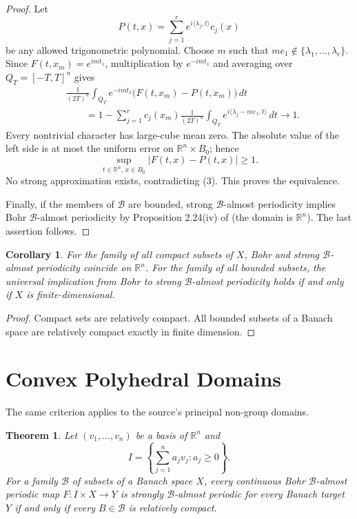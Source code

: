 \documentclass[11pt]{article}
\newtheorem{theorem}{Theorem}
\newtheorem{corollary}{Corollary}
\newcommand{\R}{\mathbb R}
\newcommand{\B}{\mathcal B}
\newcommand{\ip}[2]{\langle #1,#2\rangle}
\begin{document}
\begin{proof}
Let
\[
 P(t,x)=\sum_{j=1}^{r}e^{i\ip{\lambda_j}{t}}c_j(x)
\]
be any allowed trigonometric polynomial.  Choose $m$ such that
$me_1\notin\{\lambda_1,\ldots,\lambda_r\}$.  Since
$F(t,x_m)=e^{imt_1}$, multiplication by $e^{-imt_1}$ and averaging over
$Q_T=[-T,T]^n$ gives
\begin{align*}
 &\frac1{(2T)^n}\int_{Q_T}e^{-imt_1}
 \bigl(F(t,x_m)-P(t,x_m)\bigr)\,dt\\
 &\qquad=1-\sum_{j=1}^{r}c_j(x_m)
 \frac1{(2T)^n}\int_{Q_T}
 e^{i\ip{\lambda_j-me_1}{t}}\,dt\longrightarrow1.
\end{align*}
Every nontrivial character has large-cube mean zero.  The absolute value of
the left side is at most the uniform error on $\R^n\times B_0$; hence
\[
 \sup_{t\in\R^n,\,x\in B_0}|F(t,x)-P(t,x)|\geq1.
\]
No strong approximation exists, contradicting (3).  This proves the
equivalence.

Finally, if the members of $\B$ are bounded, strong $\B$-almost periodicity
implies Bohr $\B$-almost periodicity by Proposition 2.24(iv) of \cite{CKKP}
(the domain is $\R^n$).  The last assertion follows.
\end{proof}

\begin{corollary}\label{cor:standard}
For the family of all compact subsets of $X$, Bohr and strong
$\B$-almost periodicity coincide on $\R^n$.  For the family of all bounded
subsets, the universal implication from Bohr to strong $\B$-almost
periodicity holds if and only if $X$ is finite-dimensional.
\end{corollary}

\begin{proof}
Compact sets are relatively compact.  All bounded subsets of a Banach space
are relatively compact exactly in finite dimension.
\end{proof}

\section*{Convex Polyhedral Domains}

The same criterion applies to the source's principal non-group domains.

\begin{theorem}\label{thm:cone}
Let $(v_1,\ldots,v_n)$ be a basis of $\R^n$ and
\[
 I=\left\{\sum_{j=1}^n a_jv_j:a_j\geq0\right\}.
\]
For a family $\B$ of subsets of a Banach space $X$, every continuous Bohr
$\B$-almost periodic map $F:I\times X\to Y$ is strongly $\B$-almost
periodic for every Banach target $Y$ if and only if every $B\in\B$ is
relatively compact.
\end{theorem}
\end{document}
